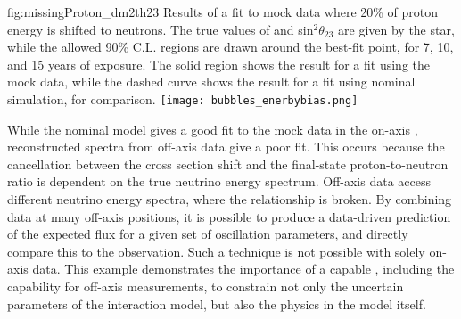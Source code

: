 \begin{dunefigure}{fig:missingProton_dm2th23}
{Results of a fit to mock data where 20\% of proton energy is shifted to neutrons. The true values of  and sin$^{2}\theta_{23}$ are given by the star, while the allowed 90\% C.L. regions are drawn around the best-fit point, for 7, 10, and 15 years of exposure. The solid region shows the result for a fit using the mock data, while the dashed curve shows the result for a fit using nominal simulation, for comparison.}
  \texttt{[image: bubbles\_enerbybias.png]}
\end{dunefigure}

While the nominal model gives a good fit to the mock data in the on-axis , reconstructed spectra from off-axis  data give a poor fit. This occurs because the cancellation between the cross section shift and the final-state proton-to-neutron ratio is dependent on the true neutrino energy spectrum. Off-axis data access different neutrino energy spectra, where the relationship is broken. By combining data at many off-axis positions, it is possible to produce a data-driven prediction of the expected  flux for a given set of oscillation parameters, and directly compare this to the observation. Such a technique is not possible with solely on-axis  data. This example demonstrates the importance of a capable , including the capability for off-axis measurements, to constrain not only the uncertain parameters of the interaction model, but also the physics in the model itself.




